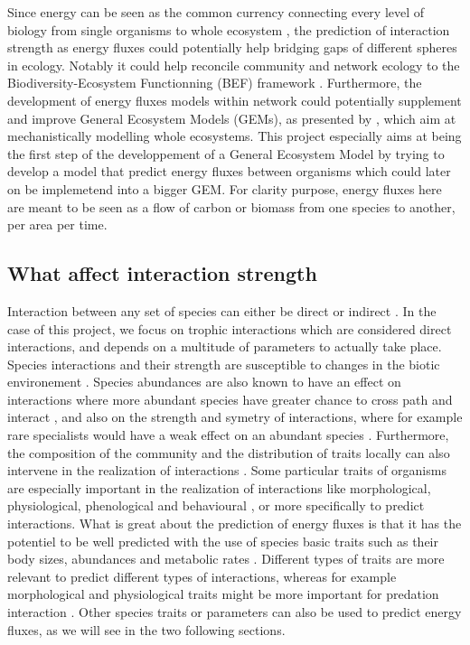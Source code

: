 \documentclass[english,12pt]{article}
\begin{document}
Since energy can be seen as the common currency connecting every level of biology from single organisms to whole ecosystem \citep{Brown2004MetThe,Barnes2018EneFlu}, the prediction of interaction strength as energy fluxes could potentially help bridging gaps of different spheres in ecology. Notably it could help reconcile community and network ecology to the Biodiversity-Ecosystem Functionning (BEF) framework \citep{Barnes2018EneFlu}. Furthermore, the development of energy fluxes models within network could potentially supplement and improve General Ecosystem Models (GEMs), as presented by \citep{Purves2013TimMod,Harfoot2014EmeGlo}, which aim at mechanistically modelling whole ecosystems. This project especially aims at being the first step of the developpement of a General Ecosystem Model by trying to develop a model that predict energy fluxes between organisms which could later on be implemetend into a bigger GEM. For clarity purpose, energy fluxes here are meant to be seen as a flow of carbon or biomass from one species to another, per area per time.

\subsection{What affect interaction strength}
Interaction between any set of species can either be direct or indirect \cite{Morales-Castilla2015InfBio,Schmitz2001EffTop}. In the case of this project, we focus on trophic interactions which are considered direct interactions, and depends on a multitude of parameters to actually take place. Species interactions and their strength are susceptible to changes in the biotic environement \citep{Tylianakis2008GloCha}. Species abundances are also known to have an effect on interactions where more abundant species have greater chance to cross path and interact \citep{Bartomeus2016ComFra}, and also on the strength and symetry of interactions, where for example rare specialists would have a weak effect on an abundant species \citep{Canadard2014EmpEva,Vazquez2007SpeAbu}. Furthermore, the composition of the community and the distribution of traits locally can also intervene in the realization of interactions \citep{Poisot2015SpeWhy}. Some particular traits of organisms are especially important in the realization of interactions like morphological, physiological, phenological and behavioural \citep{Morales-Castilla2015InfBio}, or more specifically to predict interactions. What is great about the prediction of energy fluxes is that it has the potentiel to be well predicted with the use of species basic traits such as their body sizes, abundances and metabolic rates \citep{Berlow2004IntStr}. Different types of traits are more relevant to predict different types of interactions, whereas for example morphological and physiological traits might be more important for predation interaction \cite{Bartomeus2016ComFra}. Other species traits or parameters can also be used to predict energy fluxes, as we will see in the two following sections.\
\end{document}
